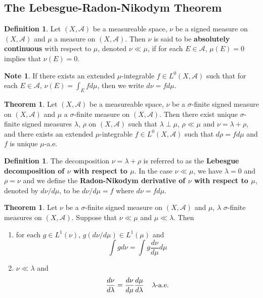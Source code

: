 \documentclass[12pt]{amsart}
\theoremstyle{definition}
\newtheorem{defn}[definition]{Definition}
\newtheorem{note}[definition]{Note}
\newtheorem{thm}[definition]{Theorem}
\newcommand{\lam}{\lambda}
\newcommand{\sig}{\sigma}
\newcommand{\MA}{\mathcal{A}}
\begin{document}
	\subsection{The Lebesgue-Radon-Nikodym Theorem}
	
	\begin{defn}
		Let $(X, \MA)$ be a measureable space, $\nu$ be a signed measure on $(X, \MA)$ and $\mu$ a measure on $(X,\MA)$. Then $\nu$ is said to be \textbf{absolutely continuous} with respect to $\mu$, denoted $\nu \ll \mu$, if for each $E \in \MA$, $\mu(E) = 0$ implies that $\nu(E) =0$. 
	\end{defn}
	
	\begin{note}
		If there exists an extended $\mu$-integrable $f \in L^0(X, \MA)$ such that for each $E \in \MA$, $\nu(E) = \int_E f d\mu$, then we write $d\nu = f d\mu$.
	\end{note}
	
	\begin{thm}
		Let $(X, \MA)$ be a measureable space, $\nu$ be a $\sig$-finite signed measure on $(X, \MA)$ and $\mu$ a $\sig$-finite measure on $(X,\MA)$. Then there exist unique $\sig$-finite signed measures $\lam$, $\rho$ on $(X, \MA)$ such that $\lam \perp \mu$, $\rho \ll \mu$ and $\nu = \lam + \rho$, and there exists an extended $\mu$-integrable $f \in L^0(X, \MA)$ such that $d\rho = f d \mu$ and $f$ is unique $\mu$-a.e.  
	\end{thm}
	
	\begin{defn}
		The decomposition $\nu = \lam + \rho$ is referred to as the \textbf{Lebesgue decomposition of $\nu$ with respect to $\mu$}. In the case $\nu \ll \mu$, we have $\lam = 0$ and $\rho = \nu$ and we define the \textbf{Radon-Nikodym derivative of $\nu$ with respect to $\mu$}, denoted by $d\nu/d\mu$, to be $d\nu/d\mu = f$ where $d\nu = fd\mu$.   
	\end{defn}
	
	\begin{thm}
		Let $\nu$ be a $\sig$-finite signed measure on $(X, \MA)$ and $\mu$, $\lam$ $\sig$-finite measures on $(X,\MA)$. Suppose that $\nu \ll \mu$ and $\mu \ll \lam$. Then 
		\begin{enumerate}
			\item for each $g \in L^1(\nu)$, $g(d\nu/d\mu) \in  L^1(\mu)$ and $$\int g d\nu = \int g \frac{d\nu}{d\mu} d\mu$$
			\item $\nu \ll \lam$ and $$\frac{d \nu}{d\lam} = \frac{d \nu}{d\mu} \frac{d\mu}{d\lam} \hspace{4mm} \lam \text{-a.e.}$$
		\end{enumerate}
	\end{thm}
	
\end{document}
